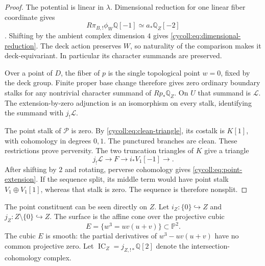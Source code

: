\begin{proof}
The potential is linear in $\lambda$. Dimensional reduction
for one linear fiber coordinate gives
\[
 R\pi_{B,!}\phi_W\mathbb Q[-1]\simeq a_*\mathbb Q_Z[-2]
\]
\cite[Theorem~A.1]{DavisonCriticalCoHA}.
Shifting by the ambient complex dimension $4$ gives
\eqref{cycoll:eq:dimensional-reduction}. The deck action
preserves $W$, so naturality of the comparison makes it
deck-equivariant. In particular its character summands
are preserved.

Over a point of $D$, the fiber of $p$ is the single
topological point $w=0$, fixed by the deck group. Finite
proper base change therefore gives zero ordinary boundary
stalks for any nontrivial character summand of
$Rp_*\mathbb Q_Z$. On $U$ that summand is $\mathcal L$.
The extension-by-zero adjunction is an isomorphism on every
stalk, identifying the summand with $j_!\mathcal L$.

The point stalk of $\mathcal P$ is zero. By
\eqref{cycoll:eq:clean-triangle}, its costalk is $K[1]$,
with cohomology in degrees $0,1$. The punctured branches
are clean. These restrictions prove perversity.
The two truncation triangles of $K$ give a triangle
\[
 j_!\mathcal L\longrightarrow F
       \longrightarrow i_*V_1[-1]\longrightarrow.
\]
After shifting by $2$ and rotating, perverse cohomology
gives \eqref{cycoll:eq:point-extension}.
If the sequence split, its middle term would have point
stalk $V_1\oplus V_1[1]$, whereas that stalk is zero.
The sequence is therefore nonsplit.
\end{proof}

The point constituent can be seen directly on $Z$. Let
$i_Z:\{0\}\hookrightarrow Z$ and
$j_Z:Z\setminus\{0\}\hookrightarrow Z$.
The surface is the affine cone over the projective cubic
\[
 E=\{w^3=uv(u+v)\}\subset\mathbb P^2.
\]
The cubic $E$ is smooth: the partial derivatives of
$w^3-uv(u+v)$ have no common projective zero.
Let $\operatorname{IC}_Z=j_{Z,!*}\mathbb Q[2]$ denote
the intersection-cohomology complex.


